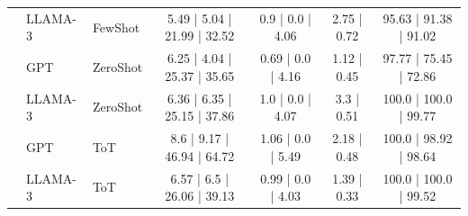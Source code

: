 \begin{table}[t]
{\begin{tabular}{lllcccc}
 & LLAMA-3 & FewShot & 5.49 | 5.04 | 21.99 | 32.52 & 0.9 | 0.0 | 4.06 & 2.75 | 0.72 & 95.63 | 91.38 | 91.02 \\
 & GPT & ZeroShot & 6.25 | 4.04 | 25.37 | 35.65 & 0.69 | 0.0 | 4.16 & 1.12 | 0.45 & 97.77 | 75.45 | 72.86 \\
 & LLAMA-3 & ZeroShot & 6.36 | 6.35 | 25.15 | 37.86 & 1.0 | 0.0 | 4.07 & 3.3 | 0.51 & 100.0 | 100.0 | 99.77 \\
 & GPT & ToT & 8.6 | 9.17 | 46.94 | 64.72 & 1.06 | 0.0 | 5.49 & 2.18 | 0.48 & 100.0 | 98.92 | 98.64 \\
 & LLAMA-3 & ToT & 6.57 | 6.5 | 26.06 | 39.13 & 0.99 | 0.0 | 4.03 & 1.39 | 0.33 & 100.0 | 100.0 | 99.52 \\
\bottomrule
\end{tabular}%
}
\end{table}
